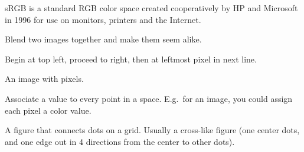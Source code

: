 \begin{definition}[SRGB]
    sRGB is a standard RGB color space created cooperatively by HP and
    Microsoft in 1996 for use on monitors, printers and the Internet.

\end{definition}


\begin{definition}
    Blend two images together and make them seem alike.
\end{definition}

\begin{definition}
    Begin at top left, proceed to right, then at leftmost pixel in next line.
\end{definition}

\begin{definition}
    An image with pixels.
\end{definition}

\begin{definition}\label{scalarfield}
    Associate a value to every point in a space. E.g.\ for an image, you
    could assign each pixel a color value.
\end{definition}

\begin{definition}[Stencil]
    A figure that connects dots on a grid. Usually a cross-like figure 
    (one center dots, and one edge out in 4 directions from the center to
    other dots).
\end{definition}
